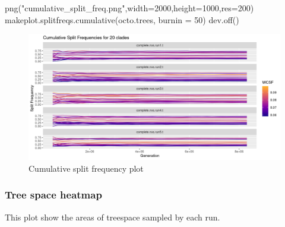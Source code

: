 \documentclass[
]{article}
\newenvironment{Shaded}{\begin{snugshade}}{\end{snugshade}}
\newcommand{\AttributeTok}[1]{\textcolor[rgb]{0.77,0.63,0.00}{#1}}
\newcommand{\DecValTok}[1]{\textcolor[rgb]{0.00,0.00,0.81}{#1}}
\newcommand{\FunctionTok}[1]{\textcolor[rgb]{0.00,0.00,0.00}{#1}}
\newcommand{\NormalTok}[1]{#1}
\newcommand{\SpecialCharTok}[1]{\textcolor[rgb]{0.00,0.00,0.00}{#1}}
\newcommand{\StringTok}[1]{\textcolor[rgb]{0.31,0.60,0.02}{#1}}
\begin{document}
\begin{Shaded}
\begin{Highlighting}[]
\FunctionTok{png}\NormalTok{(}\StringTok{"cumulative\_split\_freq.png"}\NormalTok{,}\AttributeTok{width=}\DecValTok{2000}\NormalTok{,}\AttributeTok{height=}\DecValTok{1000}\NormalTok{,}\AttributeTok{res=}\DecValTok{200}\NormalTok{)}
\FunctionTok{makeplot.splitfreqs.cumulative}\NormalTok{(octo.trees, }\AttributeTok{burnin =} \DecValTok{50}\NormalTok{)}
\FunctionTok{dev.off}\NormalTok{()}
\end{Highlighting}
\end{Shaded}

\begin{figure}
\centering
\includegraphics{cumulative_split_freq.png}
\caption{Cumulative split frequency plot}
\end{figure}

\hypertarget{tree-space-heatmap}{%
\subsubsection{Tree space heatmap}\label{tree-space-heatmap}}

This plot show the areas of treespace sampled by each run.

\begin{Shaded}
\end{Shaded}
\end{document}
